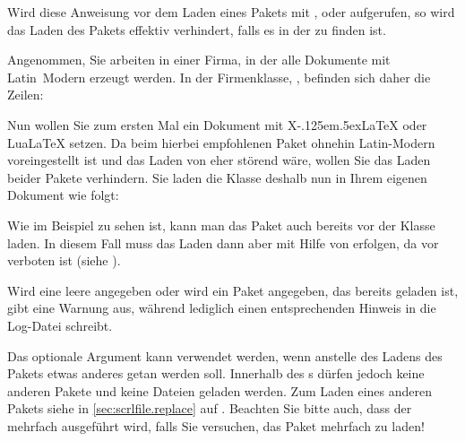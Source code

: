 \begin{Declaration}
\end{Declaration}
Wird diese Anweisung vor dem
Laden eines Pakets mit ,
 oder
aufgerufen, so wird das Laden des Pakets effektiv verhindert, falls es in
der  zu finden ist.
%
\begin{Example}
  Angenommen, Sie arbeiten in einer Firma, in der alle Dokumente mit
  Latin~Modern erzeugt werden. In der Firmenklasse, , befinden
  sich daher die Zeilen:
\begin{lstcode}
  \RequirePackage[T1]{fontenc}
  \RequirePackage{lmodern}
\end{lstcode}
  Nun wollen Sie zum ersten Mal ein Dokument mit
  X\kern-.125em\lower.5ex\hbox{}\LaTeX{} oder Lua\LaTeX{}
  setzen. Da beim hierbei empfohlenen Paket  ohnehin
  Latin-Modern voreingestellt ist und das Laden von  eher
  störend wäre, wollen Sie das Laden beider Pakete verhindern. Sie laden die
  Klasse deshalb nun in Ihrem eigenen Dokument wie folgt:
\end{Example}
Wie im Beispiel zu sehen ist, kann man das Paket  auch
bereits vor der Klasse laden. In diesem Fall muss das Laden dann aber mit
Hilfe von  erfolgen, da
 vor  verboten ist (siehe
\cite{latex:clsguide}).

Wird eine leere  angegeben oder wird ein Paket angegeben,
das bereits geladen ist, gibt  eine
Warnung aus, während
lediglich einen entsprechenden Hinweis in die Log-Datei schreibt.

Das optionale Argument kann verwendet
werden, wenn anstelle des Ladens des Pakets etwas anderes getan werden
soll. Innerhalb des s dürfen jedoch keine anderen
Pakete und keine Dateien geladen werden. Zum Laden eines anderen Pakets siehe
 in \autoref{sec:scrlfile.replace} auf
. Beachten Sie
bitte auch, dass der  mehrfach ausgeführt wird, falls
Sie versuchen, das Paket mehrfach zu laden!%
\EndIndexGroup


